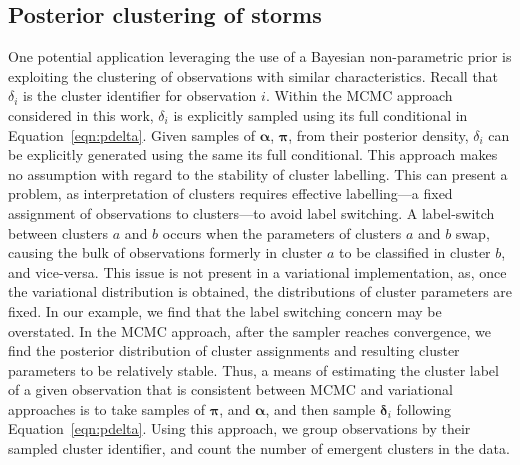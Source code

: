 \subsection{Posterior clustering of storms}
One potential application leveraging the use of a Bayesian non-parametric prior is 
    exploiting the clustering of observations with similar characteristics.  
    Recall that $\delta_i$ is the cluster identifier for observation $i$. Within the 
    MCMC approach considered in this work, $\delta_i$ is explicitly sampled using
    its full conditional in Equation~\eqref{eqn:pdelta}.  Given samples of $\bm{\alpha}$,
    $\bm{\pi}$, from their posterior density, $\delta_i$ can be explicitly generated
    using the same its full conditional.
    This approach makes no assumption with regard to the stability of cluster labelling.
    This can present a problem, as interpretation of clusters requires effective
    labelling---a fixed assignment of observations to clusters---to avoid label switching.
    A label-switch between clusters $a$ and $b$ occurs when the parameters of clusters 
    $a$ and $b$ swap, causing the bulk of observations formerly in cluster $a$ to be 
    classified in cluster $b$, and vice-versa. This issue is not present in a variational 
    implementation, as, once the variational distribution is obtained, the distributions 
    of cluster parameters are fixed.  In our example, we find that the label switching 
    concern may be overstated.  In the MCMC approach,
    after the sampler reaches convergence, we find the posterior distribution of 
    cluster assignments and resulting cluster parameters to be relatively stable.
    Thus, a means of estimating the cluster label of a given observation that 
    is consistent between MCMC and variational approaches is to take samples of $\bm{\pi}$, 
    and $\bm{\alpha}$, and then sample $\bm{\delta}_i$ following Equation~\eqref{eqn:pdelta}.  
    Using this approach, we group observations by their sampled cluster identifier, and count 
    the number of emergent clusters in the data.

